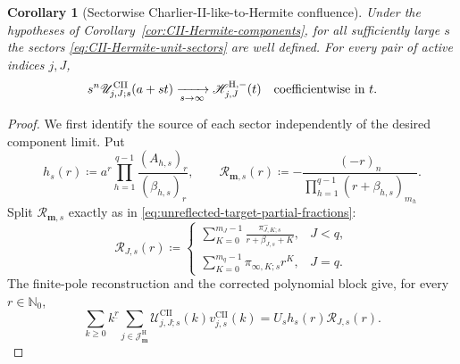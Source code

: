 \documentclass[10pt]{amsart}
\newcommand{\Nzero}{\mathbb N_0}
\newcommand{\mm}{\boldsymbol m}
\newcommand{\fall}[2]{#1^{\underline{#2}}}
\theoremstyle{plain}
\newtheorem{corollary}[theorem]{Corollary}
\theoremstyle{definition}
\theoremstyle{remark}
\begin{document}
\begin{corollary}[Sectorwise Charlier-II-like-to-Hermite confluence]
\label{cor:CII-Hermite-sector-limit}
Under the hypotheses of Corollary~\ref{cor:CII-Hermite-components}, for
all sufficiently large \(s\) the sectors
\eqref{eq:CII-Hermite-unit-sectors} are well defined.  For every pair of
active indices \(j,J\),
\begin{equation}
 s^n\mathscr U_{j,J;s}^{\mathrm{CII}}(a+st)
 \xrightarrow[s\to\infty]{}
 \mathscr H_{j,J}^{\mathrm H,-}(t)
 \quad\hbox{coefficientwise in }t .
 \label{eq:CII-Hermite-sector-limit}
\end{equation}
\end{corollary}

\begin{proof}
We first identify the source of each sector independently of the desired
component limit.  Put
\[
 h_s(r)\coloneq
 a^r\prod_{h=1}^{q-1}
 \frac{(A_{h,s})_r}{(\beta_{h,s})_r},
 \qquad
 \mathcal R_{\mm,s}(r)\coloneq
 -\frac{(-r)_n}
 {\prod_{h=1}^{q-1}(r+\beta_{h,s})_{m_h}}.
\]
Split \(\mathcal R_{\mm,s}\) exactly as in
\eqref{eq:unreflected-target-partial-fractions}:
\begin{equation}
 \mathcal R_{J,s}(r)\coloneq
 \begin{cases}
  \displaystyle\sum_{K=0}^{m_J-1}
  \frac{\pi_{J,K;s}^{-}}{r+\beta_{J,s}+K},&J<q,\\[3mm]
  \displaystyle\sum_{K=0}^{m_q-1}
  \pi_{\infty,K;s}r^K,&J=q.
 \end{cases}
 \label{eq:CII-Hermite-rational-sectors}
\end{equation}
The finite-pole reconstruction and the corrected polynomial block give,
for every \(r\in\Nzero\),
\begin{equation}
 \sum_{k\ge0}\fall{k}{r}
 \sum_{j\in\mathcal J_{\mm}^{\mathrm H}}
 \mathscr U_{j,J;s}^{\mathrm{CII}}(k)
 v_{j,s}^{\mathrm{CII}}(k)
 =U_sh_s(r)\mathcal R_{J,s}(r).
 \label{eq:CII-Hermite-exact-sector-moments}
\end{equation}


\end{proof}
\end{document}
